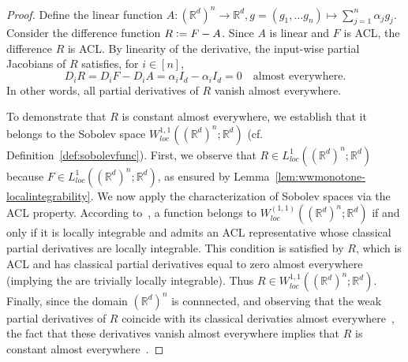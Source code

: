 \documentclass[twoside,11pt]{article}
\newcommand{\R}{\mathbb{R}}
\begin{document}
\begin{proof}
Define the linear function $A: (\mathbb{R}^d)^n \to \mathbb{R}^d, g = (g_1, \ldots g_n) \mapsto \sum_{j=1}^n \alpha_j g_j$.
Consider the difference function $R \vcentcolon= F - A$.
Since $A$ is linear and $F$ is ACL, the difference $R$ is ACL.
By linearity of the derivative, the input-wise partial Jacobians of $R$ satisfies, for $i\in[n]$,
\[ D_i R = D_i F - D_i A = \alpha_i I_d - \alpha_i I_d = 0 \quad \text{almost everywhere}. \]
In other words, all partial derivatives of $R$ vanish almost everywhere.

To demonstrate that $R$ is constant almost everywhere, we establish that it belongs to the Sobolev space $W^{1,1}_{loc}((\mathbb{R}^d)^n; \mathbb{R}^d)$ (cf. Definition~\ref{def:sobolevfunc}).
First, we observe that $R \in L^1_{loc}((\mathbb{R}^d)^n; \mathbb{R}^d)$ because $F \in L^1_{loc}((\mathbb{R}^d)^n; \mathbb{R}^d)$, as ensured by Lemma~\ref{lem:wwmonotone-localintegrability}.
We now apply the characterization of Sobolev spaces via the ACL property.
According to~\citet[Theorem 11.45, applied locally]{leoni2017first}, a function belongs to $W^{(1,1)}_{loc}((\R^d)^n; \R^d)$ if and only if it is locally integrable and admits an ACL representative whose classical partial derivatives are locally integrable.
This condition is satisfied by $R$, which is ACL and has classical partial derivatives equal to zero almost everywhere (implying the are trivially locally integrable).
Thus $R \in W^{1,1}_{loc}((\mathbb{R}^d)^n; \mathbb{R}^d)$.
Finally, since the domain $(\R^d)^n$ is connnected, and observing that the weak partial derivatives of $R$ coincide with its classical derivaties almost everywhere~\citep[Theorem 11.45]{leoni2017first}, the fact that these derivatives vanish almost everywhere implies that $R$ is constant almost everywhere~\citep[see, e.g.,][Exercise 10.28]{leoni2017first}. %
\end{proof}
\end{document}

